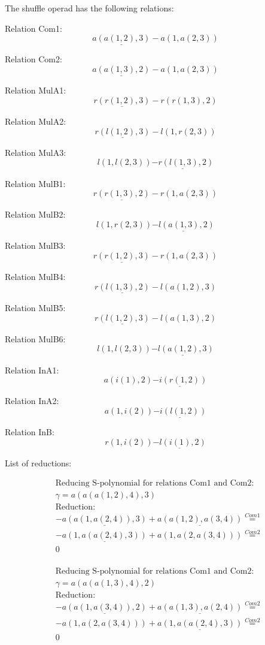 \documentclass[11pt]{amsart}
\begin{document}
 
 
The shuffle operad has the following relations: 

 Relation Com1: 
 $$ 
\underline{a(a(1,2),3)} - a(1,a(2,3))
 $$ 

 Relation Com2: 
 $$ 
\underline{a(a(1,3),2)} - a(1,a(2,3))
 $$ 

 Relation MulA1: 
 $$ 
\underline{r(r(1,2),3)} - r(r(1,3),2)
 $$ 

 Relation MulA2: 
 $$ 
\underline{r(l(1,2),3)} - l(1,r(2,3))
 $$ 

 Relation MulA3: 
 $$ 
l(1,l(2,3))\underline{ - r(l(1,3),2)}
 $$ 

 Relation MulB1: 
 $$ 
\underline{r(r(1,3),2)} - r(1,a(2,3))
 $$ 

 Relation MulB2: 
 $$ 
l(1,r(2,3))\underline{ - l(a(1,3),2)}
 $$ 

 Relation MulB3: 
 $$ 
\underline{r(r(1,2),3)} - r(1,a(2,3))
 $$ 

 Relation MulB4: 
 $$ 
\underline{r(l(1,3),2)} - l(a(1,2),3)
 $$ 

 Relation MulB5: 
 $$ 
\underline{r(l(1,2),3)} - l(a(1,3),2)
 $$ 

 Relation MulB6: 
 $$ 
l(1,l(2,3))\underline{ - l(a(1,2),3)}
 $$ 

 Relation InA1: 
 $$ 
a(i(1),2)\underline{ - i(r(1,2))}
 $$ 

 Relation InA2: 
 $$ 
a(1,i(2))\underline{ - i(l(1,2))}
 $$ 

 Relation InB: 
 $$ 
r(1,i(2))\underline{ - l(i(1),2)}
 $$ 

 
 
 List of reductions: 
 
\begin{align*} 
& \text{Reducing S-polynomial for relations Com1 and Com2:} \\ 
& \gamma = a(a(a(1,2),4),3) \\ 
& \text{Reduction}: \\& - \underline{a(a(1,a(2,4)),3)} + \underline{a(a(1,2),a(3,4))} \stackrel{ Com1 }{=}  \\ 
& - \underline{a(1,a(a(2,4),3))} + a(1,a(2,a(3,4))) \stackrel{ Com2 }{=}  \\ 
&0\\ 
\end{align*} 
 
\begin{align*} 
& \text{Reducing S-polynomial for relations Com1 and Com2:} \\ 
& \gamma = a(a(a(1,3),4),2) \\ 
& \text{Reduction}: \\& - \underline{a(a(1,a(3,4)),2)} + \underline{a(a(1,3),a(2,4))} \stackrel{ Com2 }{=}  \\ 
& - a(1,a(2,a(3,4))) + \underline{a(1,a(a(2,4),3))} \stackrel{ Com2 }{=}  \\ 
&0\\ 
\end{align*} 
 
\end{document}
